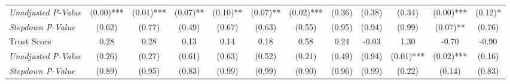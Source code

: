 \begin{tabular}{l c c c c c c c c c c c}
\quad \textit{Unadjusted P-Value} & (0.00)*** & (0.01)*** & (0.07)** & (0.10)** & (0.07)** & (0.02)*** & (0.36) & (0.38) & (0.34) & (0.00)*** & (0.12)* \\
\quad \textit{Stepdown P-Value} & (0.62) & (0.77) & (0.49) & (0.67) & (0.63) & (0.55) & (0.95) & (0.94) & (0.99) & (0.07)** & (0.76) \\
Trust Score & 0.28 & 0.28 & 0.13 & 0.14 & 0.18 & 0.58 & 0.24 & -0.03 & 1.30 & -0.70 & -0.90 \\
\quad \textit{Unadjusted P-Value} & (0.26) & (0.27) & (0.61) & (0.63) & (0.52) & (0.21) & (0.49) & (0.94) & (0.01)*** & (0.02)*** & (0.16) \\
\quad \textit{Stepdown P-Value} & (0.89) & (0.95) & (0.83) & (0.99) & (0.99) & (0.90) & (0.96) & (0.99) & (0.22) & (0.14) & (0.83) \\
\bottomrule
\end{tabular}
